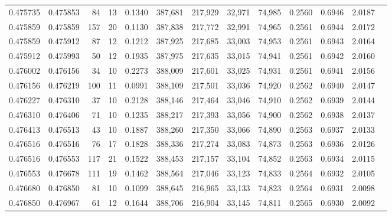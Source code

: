 \begin{tabular}{rrrrrrrrrrrrr}
0.475735 & 0.475853 &    84 &  13 &                                     0.1340 & 387,681 & 217,929 &  32,971 &  74,985 & 0.2560 & 0.6946 & 2.0187 \\
0.475859 & 0.475859 &   157 &  20 &                                     0.1130 & 387,838 & 217,772 &  32,991 &  74,965 & 0.2561 & 0.6944 & 2.0172 \\
0.475859 & 0.475912 &    87 &  12 &                                     0.1212 & 387,925 & 217,685 &  33,003 &  74,953 & 0.2561 & 0.6943 & 2.0164 \\
0.475912 & 0.475993 &    50 &  12 &                                     0.1935 & 387,975 & 217,635 &  33,015 &  74,941 & 0.2561 & 0.6942 & 2.0160 \\
0.476002 & 0.476156 &    34 &  10 &                                     0.2273 & 388,009 & 217,601 &  33,025 &  74,931 & 0.2561 & 0.6941 & 2.0156 \\
0.476156 & 0.476219 &   100 &  11 &                                     0.0991 & 388,109 & 217,501 &  33,036 &  74,920 & 0.2562 & 0.6940 & 2.0147 \\
0.476227 & 0.476310 &    37 &  10 &                                     0.2128 & 388,146 & 217,464 &  33,046 &  74,910 & 0.2562 & 0.6939 & 2.0144 \\
0.476310 & 0.476406 &    71 &  10 &                                     0.1235 & 388,217 & 217,393 &  33,056 &  74,900 & 0.2562 & 0.6938 & 2.0137 \\
0.476413 & 0.476513 &    43 &  10 &                                     0.1887 & 388,260 & 217,350 &  33,066 &  74,890 & 0.2563 & 0.6937 & 2.0133 \\
0.476516 & 0.476516 &    76 &  17 &                                     0.1828 & 388,336 & 217,274 &  33,083 &  74,873 & 0.2563 & 0.6936 & 2.0126 \\
0.476516 & 0.476553 &   117 &  21 &                                     0.1522 & 388,453 & 217,157 &  33,104 &  74,852 & 0.2563 & 0.6934 & 2.0115 \\
0.476553 & 0.476678 &   111 &  19 &                                     0.1462 & 388,564 & 217,046 &  33,123 &  74,833 & 0.2564 & 0.6932 & 2.0105 \\
0.476680 & 0.476850 &    81 &  10 &                                     0.1099 & 388,645 & 216,965 &  33,133 &  74,823 & 0.2564 & 0.6931 & 2.0098 \\
0.476850 & 0.476967 &    61 &  12 &                                     0.1644 & 388,706 & 216,904 &  33,145 &  74,811 & 0.2565 & 0.6930 & 2.0092 \\

\end{tabular}
